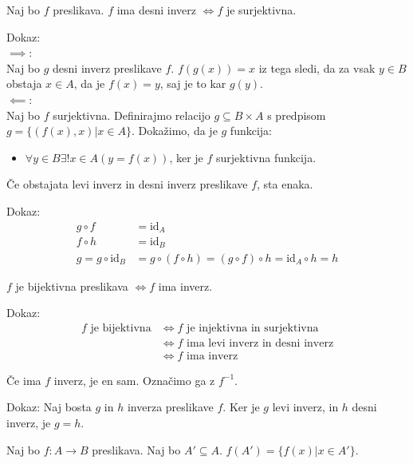 \begin{trditev}
    Naj bo $f$ preslikava.
    $f$ ima desni inverz $\iff f$ je surjektivna.
\end{trditev}
Dokaz: \\
$\implies$: \\
Naj bo $g$ desni inverz preslikave $f$.
$f(g(x)) = x$ iz tega sledi, da za vsak $y \in B$ obstaja $x \in A$, da je $f(x) = y$, saj je to kar $g(y)$. \\

$\impliedby$: \\
Naj bo $f$ surjektivna.
Definirajmo relacijo $g \subseteq B \times A$ s predpisom $g = \{(f(x), x) | x \in A\}$.
Dokažimo, da je $g$ funkcija:
\begin{itemize}
    \item $\forall y \in B \exists! x \in A(y = f(x))$, ker je $f$ surjektivna funkcija.
\end{itemize}

\begin{trditev}
    Če obstajata levi inverz in desni inverz preslikave $f$, sta enaka.
\end{trditev}
Dokaz:
\begin{align*}
    g \circ f &= \text{id}_A \\
    f \circ h &= \text{id}_B \\
    g = g \circ \text{id}_B &= g \circ (f \circ h) = (g \circ f) \circ h = \text{id}_A \circ h = h
\end{align*}

\begin{trditev}
    $f$ je bijektivna preslikava $\iff f$ ima inverz.
\end{trditev}
Dokaz:
\begin{align*}
    f \text{ je bijektivna} &\iff f \text{ je injektivna in surjektivna} \\
    &\iff f \text{ ima levi inverz in desni inverz} \\
    &\iff f \text{ ima inverz}
\end{align*}

\begin{trditev}
    Če ima $f$ inverz, je en sam.
    Označimo ga z $f^{-1}$.
\end{trditev}
Dokaz:
Naj bosta $g$ in $h$ inverza preslikave $f$.
Ker je $g$ levi inverz, in $h$ desni inverz, je $g = h$.

\begin{definicija}
    Naj bo $f: A \to B$ preslikava.
    Naj bo $A' \subseteq A$.
    $f(A') = \{f(x) | x \in A'\}$.
\end{definicija}

